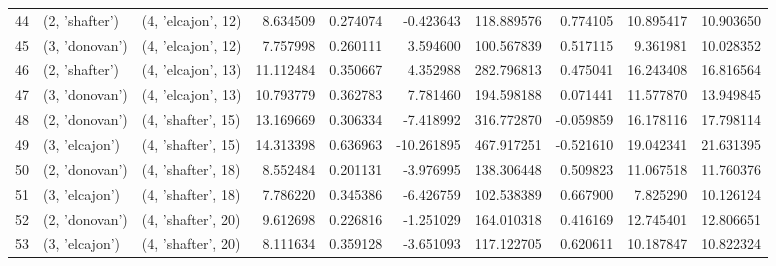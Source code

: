 \begin{tabular}{lllrrrrrrr}
44 &   (2, 'shafter') &  (4, 'elcajon', 12) &   8.634509 &  0.274074 &  -0.423643 &   118.889576 &  0.774105 &  10.895417 &  10.903650 \\
45 &   (3, 'donovan') &  (4, 'elcajon', 12) &   7.757998 &  0.260111 &   3.594600 &   100.567839 &  0.517115 &   9.361981 &  10.028352 \\
46 &   (2, 'shafter') &  (4, 'elcajon', 13) &  11.112484 &  0.350667 &   4.352988 &   282.796813 &  0.475041 &  16.243408 &  16.816564 \\
47 &   (3, 'donovan') &  (4, 'elcajon', 13) &  10.793779 &  0.362783 &   7.781460 &   194.598188 &  0.071441 &  11.577870 &  13.949845 \\
48 &   (2, 'donovan') &  (4, 'shafter', 15) &  13.169669 &  0.306334 &  -7.418992 &   316.772870 & -0.059859 &  16.178116 &  17.798114 \\
49 &   (3, 'elcajon') &  (4, 'shafter', 15) &  14.313398 &  0.636963 & -10.261895 &   467.917251 & -0.521610 &  19.042341 &  21.631395 \\
50 &   (2, 'donovan') &  (4, 'shafter', 18) &   8.552484 &  0.201131 &  -3.976995 &   138.306448 &  0.509823 &  11.067518 &  11.760376 \\
51 &   (3, 'elcajon') &  (4, 'shafter', 18) &   7.786220 &  0.345386 &  -6.426759 &   102.538389 &  0.667900 &   7.825290 &  10.126124 \\
52 &   (2, 'donovan') &  (4, 'shafter', 20) &   9.612698 &  0.226816 &  -1.251029 &   164.010318 &  0.416169 &  12.745401 &  12.806651 \\
53 &   (3, 'elcajon') &  (4, 'shafter', 20) &   8.111634 &  0.359128 &  -3.651093 &   117.122705 &  0.620611 &  10.187847 &  10.822324 \\
\bottomrule
\end{tabular}
